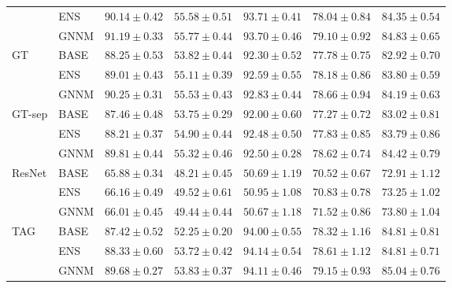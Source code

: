 \begin{table}[t]
{\begin{tabular}{llrrrrr}
 & ENS & $90.14 \pm 0.42$ & $55.58 \pm 0.51$ & $\mathbf{93.71} \pm 0.41$ & $78.04 \pm 0.84$ & $84.35 \pm 0.54$\\
 & GNNM & $\mathbf{91.19} \pm 0.33$ & $\mathbf{55.77} \pm 0.44$ & $93.70 \pm 0.46$ & $\mathbf{79.10} \pm 0.92$ & $\mathbf{84.83} \pm 0.65$\\
\addlinespace[2pt]
GT & BASE & $88.25 \pm 0.53$ & $53.82 \pm 0.44$ & $92.30 \pm 0.52$ & $77.78 \pm 0.75$ & $82.92 \pm 0.70$\\
 & ENS & $89.01 \pm 0.43$ & $55.11 \pm 0.39$ & $92.59 \pm 0.55$ & $78.18 \pm 0.86$ & $83.80 \pm 0.59$\\
 & GNNM & $\mathbf{90.25} \pm 0.31$ & $\mathbf{55.53} \pm 0.43$ & $\mathbf{92.83} \pm 0.44$ & $\mathbf{78.66} \pm 0.94$ & $\mathbf{84.19} \pm 0.63$\\
\addlinespace[2pt]
GT-sep & BASE & $87.46 \pm 0.48$ & $53.75 \pm 0.29$ & $92.00 \pm 0.60$ & $77.27 \pm 0.72$ & $83.02 \pm 0.81$\\
 & ENS & $88.21 \pm 0.37$ & $54.90 \pm 0.44$ & $92.48 \pm 0.50$ & $77.83 \pm 0.85$ & $83.79 \pm 0.86$\\
 & GNNM & $\mathbf{89.81} \pm 0.44$ & $\mathbf{55.32} \pm 0.46$ & $\mathbf{92.50} \pm 0.28$ & $\mathbf{78.62} \pm 0.74$ & $\mathbf{84.42} \pm 0.79$\\
\addlinespace[2pt]
ResNet & BASE & $65.88 \pm 0.34$ & $48.21 \pm 0.45$ & $50.69 \pm 1.19$ & $70.52 \pm 0.67$ & $72.91 \pm 1.12$\\
 & ENS & $\mathbf{66.16} \pm 0.49$ & $\mathbf{49.52} \pm 0.61$ & $\mathbf{50.95} \pm 1.08$ & $70.83 \pm 0.78$ & $73.25 \pm 1.02$\\
 & GNNM & $66.01 \pm 0.45$ & $49.44 \pm 0.44$ & $50.67 \pm 1.18$ & $\mathbf{71.52} \pm 0.86$ & $\mathbf{73.80} \pm 1.04$\\
\addlinespace[2pt]
TAG & BASE & $87.42 \pm 0.52$ & $52.25 \pm 0.20$ & $94.00 \pm 0.55$ & $78.32 \pm 1.16$ & $84.81 \pm 0.81$\\
 & ENS & $88.33 \pm 0.60$ & $53.72 \pm 0.42$ & $\mathbf{94.14} \pm 0.54$ & $78.61 \pm 1.12$ & $84.81 \pm 0.71$\\
 & GNNM & $\mathbf{89.68} \pm 0.27$ & $\mathbf{53.83} \pm 0.37$ & $94.11 \pm 0.46$ & $\mathbf{79.15} \pm 0.93$ & $\mathbf{85.04} \pm 0.76$\\
\bottomrule
\end{tabular}}
\end{table}

